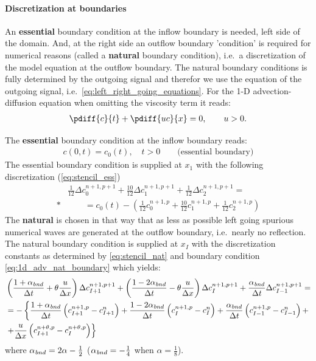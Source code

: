 \paragraph*{Discretization at boundaries}
An \textbf{essential} boundary condition at the inflow boundary is needed, left side of the domain.
And, at the right side an outflow boundary 'condition' is required for numerical reasons (called  a \textbf{natural} boundary condition), i.e.\ a discretization of the model equation at the outflow boundary.
The natural boundary conditions is fully determined by the outgoing signal and therefor we use the equation of the outgoing signal, i.e.\ \autoref{eq:left_right_going_equations}.
For the 1-D advection-diffusion equation when omitting the viscosity term it reads:
\begin{align}
    \pdiff{c}{t} + \pdiff{uc}{x}  = 0, \qquad u>0. \label{eq:1d_adv_nat_boundary}
\end{align}

The \textbf{essential} boundary condition at the inflow boundary reads:
\begin{align}
    c(0,t) = c_0(t), \quad t > 0 \qquad \text{(essential boundary)}
\end{align}
The essential boundary condition is supplied at $x_1$ with the following discretization (\autoref{eq:stencil_ess})
\begin{align}
    &\frac{1}{12} \Delta c^{n+1,p+1}_0 + \frac{10}{12} \Delta c^{n+1,p+1}_1 + \frac{1}{12}\Delta c^{n+1,p+1}_2 =
    \nonumber \\*
    &\qquad =c_0(t) - \left( \frac{1}{12} c^{n+1,p}_0 + \frac{10}{12} c^{n+1,p}_1 + \frac{1}{12} c^{n+1,p}_2 \right)
\end{align}
%
The \textbf{natural} is chosen in that way that as less as possible left going spurious numerical waves are generated at the outflow boundary, i.e.\ nearly no reflection.
The natural boundary condition is supplied at $x_I$ with the discretization constants as determined by \autoref{eq:stencil_nat} and boundary condition \autoref{eq:1d_adv_nat_boundary} which yields:
\begin{align}
    &\left( \frac{1+\alpha_{\mathit{bnd}}}{\Delta t} + \theta \frac{u}{\Delta x} \right) \Delta c^{n+1,p+1}_{I+1} +
     \left( \frac{1-2\alpha_{\mathit bnd}}{\Delta t} - \theta \frac{u}{\Delta x} \right) \Delta c^{n+1,p+1}_I +
      \frac{\alpha_{\mathit bnd}}{\Delta t}  \Delta c^{n+1,p+1}_{I-1}  =
    \\
    & = - \left\{
          \frac{1+\alpha_{\mathit bnd}}{\Delta t} \left( c^{n+1,p}_{I+1} - c^n_{I+1} \right)
        + \frac{1-2\alpha_{\mathit bnd}}{\Delta t} \left( c^{n+1,p}_{I} - c^n_{I} \right)
        + \frac{\alpha_{\mathit bnd}}{\Delta t} \left( c^{n+1,p}_{I-1}- c^n_{I-1} \right) +
        \right. \\
    & \left. + \frac{u}{\Delta x} \left(c^{n+\theta,p}_{I+1} - c^{n+\theta,p}_{I} \right)
        \right\}
\end{align}
where $\alpha_{\mathit bnd} = 2\alpha -\frac{1}{2}$ ($\alpha_{\mathit bnd} = -\frac{1}{4}$ when $\alpha = \frac{1}{8}$).

